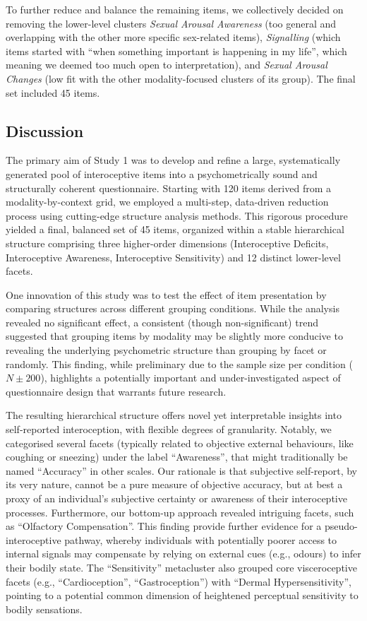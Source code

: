 \documentclass[
  jou,
  floatsintext,
  longtable,
  nolmodern,
  notxfonts,
  notimes,
  colorlinks=true,linkcolor=blue,citecolor=blue,urlcolor=blue]{apa7}
\begin{document}
To further reduce and balance the remaining items, we collectively
decided on removing the lower-level clusters \emph{Sexual Arousal
Awareness} (too general and overlapping with the other more specific
sex-related items), \emph{Signalling} (which items started with ``when
something important is happening in my life'', which meaning we deemed
too much open to interpretation), and \emph{Sexual Arousal Changes} (low
fit with the other modality-focused clusters of its group). The final
set included 45 items.

\subsection{Discussion}\label{discussion}

The primary aim of Study 1 was to develop and refine a large,
systematically generated pool of interoceptive items into a
psychometrically sound and structurally coherent questionnaire. Starting
with 120 items derived from a modality-by-context grid, we employed a
multi-step, data-driven reduction process using cutting-edge structure
analysis methods. This rigorous procedure yielded a final, balanced set
of 45 items, organized within a stable hierarchical structure comprising
three higher-order dimensions (Interoceptive Deficits, Interoceptive
Awareness, Interoceptive Sensitivity) and 12 distinct lower-level
facets.

One innovation of this study was to test the effect of item presentation
by comparing structures across different grouping conditions. While the
analysis revealed no significant effect, a consistent (though
non-significant) trend suggested that grouping items by modality may be
slightly more conducive to revealing the underlying psychometric
structure than grouping by facet or randomly. This finding, while
preliminary due to the sample size per condition (\(N \pm 200\)),
highlights a potentially important and under-investigated aspect of
questionnaire design that warrants future research.

The resulting hierarchical structure offers novel yet interpretable
insights into self-reported interoception, with flexible degrees of
granularity. Notably, we categorised several facets (typically related
to objective external behaviours, like coughing or sneezing) under the
label ``Awareness'', that might traditionally be named ``Accuracy'' in
other scales. Our rationale is that subjective self-report, by its very
nature, cannot be a pure measure of objective accuracy, but at best a
proxy of an individual's subjective certainty or awareness of their
interoceptive processes. Furthermore, our bottom-up approach revealed
intriguing facets, such as ``Olfactory Compensation''. This finding
provide further evidence for a pseudo-interoceptive pathway, whereby
individuals with potentially poorer access to internal signals may
compensate by relying on external cues (e.g., odours) to infer their
bodily state. The ``Sensitivity'' metacluster also grouped core
visceroceptive facets (e.g., ``Cardioception'', ``Gastroception'') with
``Dermal Hypersensitivity'', pointing to a potential common dimension of
heightened perceptual sensitivity to bodily sensations.
\end{document}
